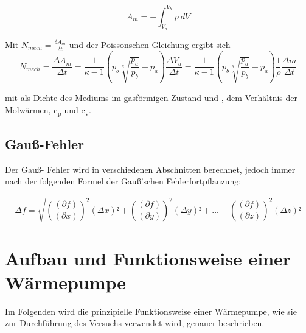 \documentclass[titlepage=firstcover, captions=tableheading]{scrartcl}
\begin{document}
\begin{displaymath}
    A_m = -\int_{V_a}^{V_b} p \: dV
\end{displaymath} 

\noindent Mit $ N_{mech} = \frac{\delta A_m}{\delta t} $ und der Poissonschen Gleichung ergibt sich
\begin{equation} \label{kompressorleistung}
    N_{mech} =\frac{\Delta A_m}{\Delta t} 
    = \frac{1}{\kappa -1} \left(p_b\sqrt[\kappa]{\frac{p_a}{p_b}}-p_a\right) \frac{\Delta V_a}{\Delta t}
    = \frac{1}{\kappa -1} \left(p_b\sqrt[\kappa]{\frac{p_a}{p_b}}-p_a\right) \frac{1}{\rho} \frac{\Delta m}{\Delta t}
\end{equation}

\noindent mit \rho \: als Dichte des Mediums im gasförmigen Zustand und \kappa , dem Verhältnis der Molwärmen, c\textsubscript{p} und c\textsubscript{v}.

\subsection{Gauß-Fehler}

Der Gauß- Fehler wird in verschiedenen Abschnitten berechnet, jedoch immer nach der folgenden Formel der Gauß'schen Fehlerfortpflanzung:

\begin{equation} \label{4}
    \Delta f = \sqrt{\left(\frac{(\partial f)}{(\partial x)}\right)^2 (\Delta x)² +
                     \left(\frac{(\partial f)}{(\partial y)}\right)^2 (\Delta y)² + ... +
                     \left(\frac{(\partial f)}{(\partial z)}\right)^2 (\Delta z)²
    }
\end{equation}

\section{Aufbau und Funktionsweise einer Wärmepumpe}

Im Folgenden wird die prinzipielle Funktionsweise einer Wärmepumpe, wie sie zur Durchführung des Versuchs verwendet wird, genauer beschrieben. 
\end{document}
